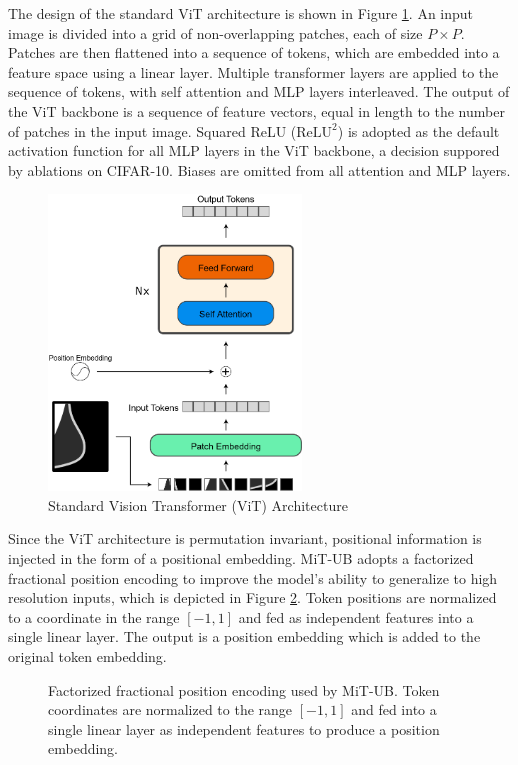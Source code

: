 \documentclass[12pt]{article}
\newcommand{\reluTwo}{$\text{ReLU}^2$}
\begin{document}
The design of the standard ViT architecture is shown in Figure \ref{fig:vit}. An input image is divided into a grid of non-overlapping patches, each of size $P \times P$. 
Patches are then flattened into a sequence of tokens, which are embedded into a feature space using a linear layer.
Multiple transformer layers are applied to the sequence of tokens, with self attention and MLP layers interleaved. 
The output of the ViT backbone is a sequence of feature vectors, equal in length to the number of patches in the input image.
Squared ReLU (\reluTwo) \cite{so2022relu2} is adopted as the default activation function for all MLP layers in the ViT backbone,  
a decision suppored by ablations on CIFAR-10. 
Biases are omitted from all attention and MLP layers.

\begin{figure}[H]
    \centering
    \includegraphics[width=0.6\textwidth]{./figures/vit.png}
    \caption{Standard Vision Transformer (ViT) Architecture}
    \label{fig:vit}
\end{figure}

Since the ViT architecture is permutation invariant, positional information is injected in the form of a positional embedding.
MiT-UB adopts a factorized fractional position encoding \cite{navit2024} to improve the model's ability to generalize to high resolution inputs, which is depicted in Figure \ref{fig:position-encoding}. 
Token positions are normalized to a coordinate in the range $[-1, 1]$ and fed as independent features into a single linear layer. The output is a position embedding which is added to the original token embedding.


\begin{figure}[H]
    \centering
    
    \caption{Factorized fractional position encoding used by MiT-UB. Token coordinates are normalized to the range $[-1, 1]$ and fed into a single linear layer as independent features to produce a position embedding.
    }
    \label{fig:position-encoding}
\end{figure}
\end{document}
